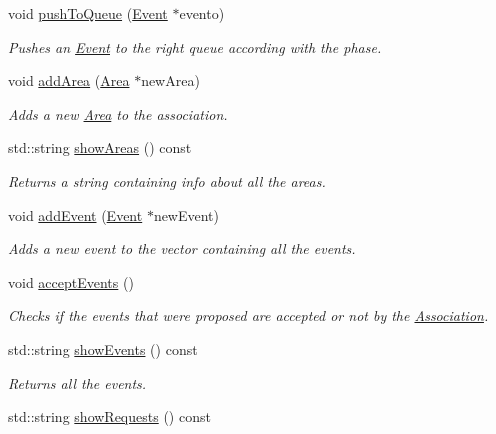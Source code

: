 \begin{DoxyCompactItemize}
void \mbox{\hyperlink{classAssociation_aaf6b3eabb3b20c31a56f69913cb3fdb3}{push\+To\+Queue}} (\mbox{\hyperlink{classEvent}{Event}} $\ast$evento)
\begin{DoxyCompactList}\small\item\em Pushes an \mbox{\hyperlink{classEvent}{Event}} to the right queue according with the phase. \end{DoxyCompactList}\item 
void \mbox{\hyperlink{classAssociation_a33ebf26ce910d02ce8a702e4ff86551b}{add\+Area}} (\mbox{\hyperlink{classArea}{Area}} $\ast$new\+Area)
\begin{DoxyCompactList}\small\item\em Adds a new \mbox{\hyperlink{classArea}{Area}} to the association. \end{DoxyCompactList}\item 
std\+::string \mbox{\hyperlink{classAssociation_a149a29d7d7b59d15dadd84a2289c87e4}{show\+Areas}} () const
\begin{DoxyCompactList}\small\item\em Returns a string containing info about all the areas. \end{DoxyCompactList}\item 
void \mbox{\hyperlink{classAssociation_a047b29b0d39da0695de0200ad495dee1}{add\+Event}} (\mbox{\hyperlink{classEvent}{Event}} $\ast$new\+Event)
\begin{DoxyCompactList}\small\item\em Adds a new event to the vector containing all the events. \end{DoxyCompactList}\item 
void \mbox{\hyperlink{classAssociation_a944406d8918729d1b9f0c7b5e34997d2}{accept\+Events}} ()
\begin{DoxyCompactList}\small\item\em Checks if the events that were proposed are accepted or not by the \mbox{\hyperlink{classAssociation}{Association}}. \end{DoxyCompactList}\item 
std\+::string \mbox{\hyperlink{classAssociation_aff3817596c302056ca73ca6a98e7bf3c}{show\+Events}} () const
\begin{DoxyCompactList}\small\item\em Returns all the events. \end{DoxyCompactList}\item 
std\+::string \mbox{\hyperlink{classAssociation_a7d743e480f5dbba9189a40d17b931121}{show\+Requests}} () const

\end{DoxyCompactItemize}

